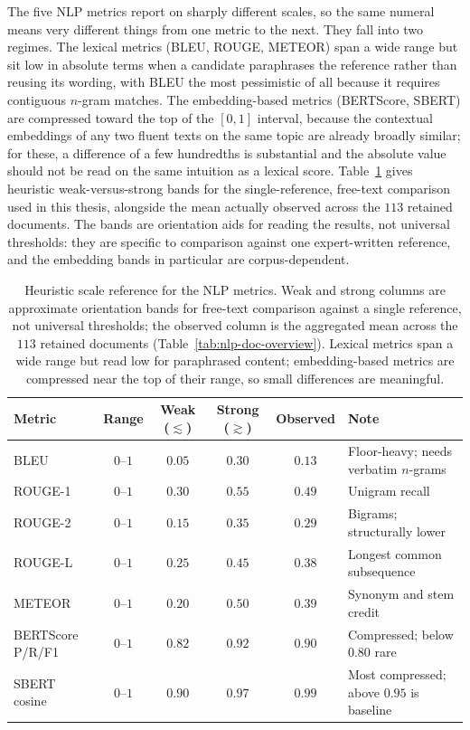 The five NLP metrics report on sharply different scales, so the
same numeral means very different things from one metric to the
next. They fall into two regimes. The lexical metrics (BLEU,
ROUGE, METEOR) span a wide range but sit low in absolute terms
when a candidate paraphrases the reference rather than reusing
its wording, with BLEU the most pessimistic of all because it
requires contiguous $n$-gram matches. The embedding-based
metrics (BERTScore, SBERT) are compressed toward the top of
the $[0,1]$ interval, because the contextual embeddings of any
two fluent texts on the same topic are already broadly similar;
for these, a difference of a few hundredths is substantial and
the absolute value should not be read on the same intuition as
a lexical score. Table~\ref{tab:metric-scales} gives heuristic
weak-versus-strong bands for the single-reference, free-text
comparison used in this thesis, alongside the mean actually
observed across the $113$ retained documents. The bands are
orientation aids for reading the results, not universal
thresholds: they are specific to comparison against one
expert-written reference, and the embedding bands in particular
are corpus-dependent.

\begin{table}[htbp]
\centering
\begin{tabularx}{\linewidth}{@{}l c c c c X@{}}
\toprule
Metric & Range & Weak ($\lesssim$) & Strong ($\gtrsim$) & Observed & Note \\
\midrule
BLEU              & $0$--$1$ & $0.05$ & $0.30$ & $0.13$ & Floor-heavy; needs verbatim $n$-grams \\
ROUGE-1           & $0$--$1$ & $0.30$ & $0.55$ & $0.49$ & Unigram recall \\
ROUGE-2           & $0$--$1$ & $0.15$ & $0.35$ & $0.29$ & Bigrams; structurally lower \\
ROUGE-L           & $0$--$1$ & $0.25$ & $0.45$ & $0.38$ & Longest common subsequence \\
METEOR            & $0$--$1$ & $0.20$ & $0.50$ & $0.39$ & Synonym and stem credit \\
\midrule
BERTScore P/R/F1  & $0$--$1$ & $0.82$ & $0.92$ & $0.90$ & Compressed; below $0.80$ rare \\
SBERT cosine      & $0$--$1$ & $0.90$ & $0.97$ & $0.99$ & Most compressed; above $0.95$ is baseline \\
\bottomrule
\end{tabularx}
\caption{Heuristic scale reference for the NLP metrics. Weak and
strong columns are approximate orientation bands for free-text
comparison against a single reference, not universal thresholds;
the observed column is the aggregated mean across the $113$
retained documents (Table~\ref{tab:nlp-doc-overview}). Lexical
metrics span a wide range but read low for paraphrased content;
embedding-based metrics are compressed near the top of their
range, so small differences are meaningful.}
\label{tab:metric-scales}
\end{table}

